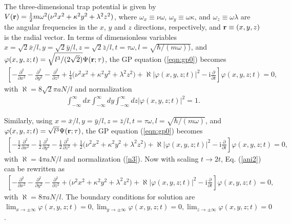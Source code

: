\documentclass[onecolumn]{elsart3p}
\begin{document}
The three-dimensional trap potential is given by $V({\bf r})
=\frac{1}{2}m \omega^2(\nu^2\bar x^2+\kappa^2\bar
y^2+\lambda^2\bar
z^2)$,
where $\omega_x \equiv \nu \omega$, $\omega_y\equiv \omega\kappa$, and
$\omega_z\equiv \omega\lambda$ are the angular frequencies in the
$x$,
$y$ and $z$ directions, respectively, and ${\bf r}\equiv (\bar x,\bar
y,\bar z)$ is the radial vector. In terms of dimensionless variables
$x=\sqrt 2 \bar x/l, y=\sqrt 2 \bar y/l,z=\sqrt 2 \bar z/l, t=\tau
\omega, l=\sqrt{\hbar/(m\omega))}$, and $\varphi(x,y,z;t)=\sqrt{
l^3/(2\sqrt 2)}\Psi({\bf r};\tau)$, the GP equation (\ref{eqn:gp0})
becomes
\begin{align}
\left[
-\frac{\partial^2}{\partial  x^2}
-\frac{\partial^2}{\partial  y^2}
-\frac{\partial^2}{\partial  z^2}
+\frac{1}{4} \biggr(\nu^2x^2+\kappa^2 y^2+\lambda^2 z^2  \biggr)
+   \aleph %
\left\vert\varphi(x,y,z;t)\right\vert^2 - \mbox{i}
\frac{\partial}{\partial  t} \right]
\varphi(x,y,z;t)= 0,\label{ani}
\end{align}
with $\aleph %
=8\sqrt 2 \pi aN/l$ and normalization
\begin{align}\label{n3}
\int_{-\infty}^{\infty}dx
\int_{-\infty}^{\infty}dy
\int_{-\infty}^{\infty}dz
|\varphi(x,y,z;t)|^2 =1.
\end{align}

Similarly, using $x=\bar x/l, y=\bar y/l,z= \bar
z/l, t=\tau
\omega, l=\sqrt{\hbar/(m\omega)}$, and $\varphi(x,y,z;t)=\sqrt{
l^3}\Psi({\bf r};\tau)$, the GP equation (\ref{eqn:gp0}) becomes
\begin{eqnarray}
\left[
-\frac{1}{2}\frac{\partial^2}{\partial  x^2}
-\frac{1}{2}\frac{\partial^2}{\partial  y^2}
-\frac{1}{2}\frac{\partial^2}{\partial  z^2}
+\frac{1}{2} \biggr(\nu^2x^2+\kappa^2 y^2+\lambda^2 z^2  \biggr)
+\aleph  %
\left\vert\varphi(x,y,z;t)\right\vert^2 - \mbox{i}
\frac{\partial}{\partial
t} \right]
\varphi(x,y,z;t)= 0,\label{ani2}
\end{eqnarray}
with $\aleph %
=4 \pi aN/l$ and normalization (\ref{n3}). Now 
with
scaling $t\to 2t$, Eq. (\ref{ani2}) can be rewritten as
\begin{eqnarray}
\left[
-\frac{\partial^2}{\partial  x^2}
-\frac{\partial^2}{\partial  y^2}
-\frac{\partial^2}{\partial  z^2}
+ \biggr(\nu^2x^2+\kappa^2 y^2+\lambda^2 z^2  \biggr)
+\aleph  %
\left\vert\varphi(x,y,z;t)\right\vert^2 - \mbox{i}
\frac{\partial}{\partial
t} \right]
\varphi(x,y,z;t)= 0,\label{ani3}
\end{eqnarray}
with $\aleph  %
=8\pi aN/l$.
The boundary conditions for solution are $\lim_{x\to \pm \infty}
\varphi(x,y,z;t)=0, \lim_{y\to \pm \infty}
\varphi(x,y,z;t)=0,\lim_{z\to \pm \infty}
\varphi(x,y,z;t)=0$  \cite{koonin}.
\end{document}
